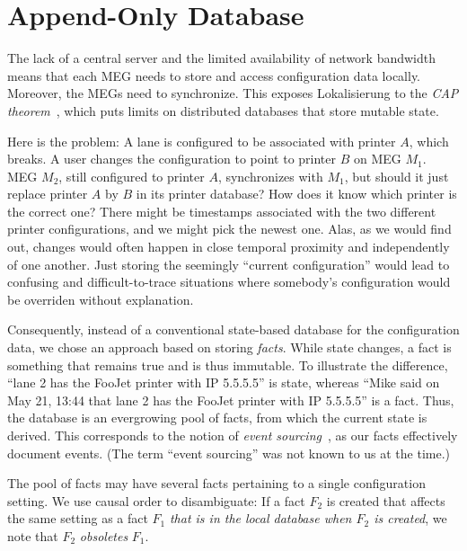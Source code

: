 \documentclass[sigplan,review]{acmart}
\begin{document}
\section{Append-Only Database}
\label{sec:addonlydb}

The lack of a central server and the limited availability of network
bandwidth means that each MEG needs to store and access configuration
data locally. Moreover, the MEGs need to synchronize.
This exposes Lokalisierung to the \textit{CAP
  theorem}~\cite{CAP}, which puts limits on distributed databases
that store mutable state.

Here is the problem: A lane is configured to be associated with
printer $A$, which breaks.  A user changes the configuration to point
to printer $B$ on MEG $M_1$.  MEG $M_2$, still configured to printer
$A$, synchronizes with $M_1$, but should it just replace printer $A$
by $B$ in its printer database?  How does it know which printer is the
correct one?  There might be timestamps associated with the two
different printer configurations, and we might pick the newest
one. Alas, as we would find out, changes would often happen in close
temporal proximity and independently of one another. Just storing the
seemingly ``current configuration'' would lead to confusing and
difficult-to-trace situations where somebody's configuration would be
overriden without explanation.

Consequently, instead of a conventional state-based database for the
configuration data, we chose an approach based on storing
\textit{facts}.  While state changes, a fact is something that remains
true and is thus immutable. To illustrate the difference, ``lane 2 has
the FooJet printer with IP 5.5.5.5'' is state, whereas ``Mike said on
May 21, 13:44 that lane 2 has the FooJet printer with IP 5.5.5.5'' is
a fact.  Thus, the database is an evergrowing pool of facts, from
which the current state is derived.  This corresponds to the notion of
\textit{event sourcing}~\cite{FowlerEventSourcing2005,Stopford2018}, as our facts effectively
document events.  (The term ``event sourcing'' was not known to us at
the time.)

The pool of facts may have several facts pertaining to a single
configuration setting. We use causal order to disambiguate: If a fact
$F_2$ is created that affects the same setting as a fact $F_1$
\emph{that is in the local database when $F_2$ is created}, we note
that $F_2$ \textit{obsoletes} $F_1$.
\end{document}
